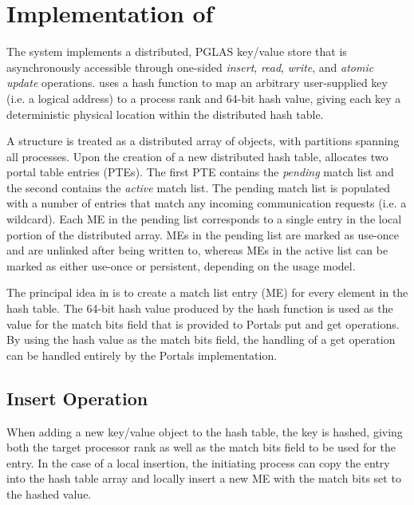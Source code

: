 \section{Implementation of \pdht}


The \pdht system implements a distributed, PGLAS key/value store that
is asynchronously accessible through one-sided {\em insert}, {\em
  read}, {\em write}, and {\em atomic update} operations.  \pdht uses
a hash function to map an arbitrary user-supplied key (i.e. a logical
address) to a process rank and 64-bit hash value, giving each key a
deterministic physical location within the distributed hash table.

A \pdht structure is treated as a distributed array of objects, with
partitions spanning all processes. Upon the creation of a new
distributed hash table, \pdht allocates two portal table
entries (PTEs). The first PTE contains the {\em pending} match list and the
second contains the {\em active} match list. The pending match list is
populated with a number of entries that match any incoming
communication requests (i.e. a wildcard). Each ME in the pending list
corresponds to a single entry in the local portion of the distributed
array. MEs in the pending list are marked as use-once and are unlinked
after being written to, whereas MEs in the active list can be marked as either
use-once or persistent, depending on the usage model.

The principal idea in \pdht is to create a match list entry (ME) for
every element in the hash table. The 64-bit hash value produced by the
hash function is used as the value for the match bits field that is provided
to Portals put and get operations. By using the hash value as
the match bits field, the handling of a get operation can be
handled entirely by the Portals implementation.


\subsection{Insert Operation}

When adding a new key/value object to the hash table, the key is
hashed, giving both the target processor rank as well as the match
bits field to be used for the entry. In the case of a local insertion,
the initiating process can copy the entry into the hash table array and
locally insert a new ME with the match bits set to the hashed value. 

